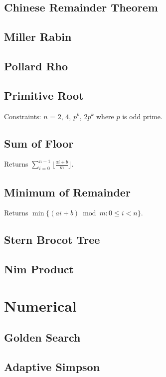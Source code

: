 \documentclass{article}
\begin{document}
\begin{multicols}{2}
    \subsection{Chinese Remainder Theorem}
    
    \subsection{Miller Rabin}
    
    \subsection{Pollard Rho}
    
    \subsection{Primitive Root}
    Constraints: $n$ = $2$, $4$, $p^k$, $2p^{k}$ where $p$ is odd prime.
    
    \subsection{Sum of Floor}
    Returns $\sum_{i=0}^{n-1}\lfloor\frac{ai+b}{m}\rfloor$.
    
    \subsection{Minimum of Remainder}
    Returns $\min\{(ai+b)\bmod m:0\le i<n\}$.
    
    \subsection{Stern Brocot Tree}
    
    \subsection{Nim Product}
    

    \section{Numerical}
    \subsection{Golden Search}
    
    \subsection{Adaptive Simpson}
    

\end{multicols}
\end{document}
